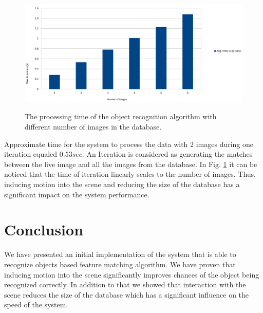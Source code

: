 \begin{figure}

\includegraphics[width=1.5\columnwidth]{figures/thesis-time.png}\\


\caption{The processing time of the object recognition algorithm with different number of images in the database.}
\label{fig:recognition-time}
\end{figure}

Approximate time for the system to process the data with 2 images during one iteration equaled $0.53 sec$. An Iteration is considered as generating the matches between the live image and all the images from the database. In Fig. \ref{fig:recognition-time} it can be noticed that the time of iteration linearly scales to the number of images. Thus, inducing motion into the scene and reducing the size of the database has a significant impact on the system performance.





\section{Conclusion}
We have presented an initial implementation of the system that is able to recognize objects based feature matching algorithm. We have proven that inducing motion into the scene significantly improves chances of the object being recognized correctly. In addition to that we showed that interaction with the scene reduces the size of the database which has a significant influence on the speed of the system.  
